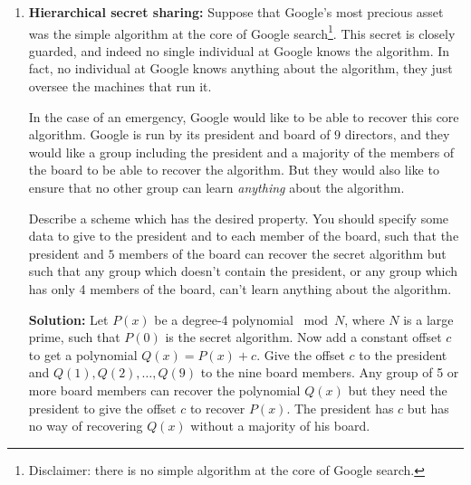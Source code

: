 \documentclass[11pt,fleqn]{article}
\begin{document}
\begin{enumerate}
\item \textbf{Hierarchical secret sharing:}
Suppose that Google's most precious asset
was the simple algorithm at the core of Google search\footnote{Disclaimer: 
there is no simple algorithm at the core of Google search.}.
This secret is closely guarded,
and indeed no single individual at Google knows the algorithm.
In fact, no individual at Google knows anything about the algorithm,
they just oversee the machines that run it.

In the case of an emergency, Google would like to be able to recover this core algorithm.
Google is run by its president and board of $9$ directors,
and they would like a group including
the president and a majority of the members of the board to be able to recover the algorithm.
But they would also like to ensure that no other group can learn \emph{anything} about the algorithm.

Describe a scheme which has the desired property.
You should specify some data to give to the president
and to each member of the board,
such that the president and $5$ members of the board can recover
the secret algorithm but such that any group which doesn't contain the president,
or any group which has only 4 members of the board,
can't learn anything about the algorithm.

\textbf{Solution:} Let $P(x)$ be a degree-4 polynomial $\bmod N$, where $N$ is a large prime, such that $P(0)$ is the secret algorithm.
Now add a constant offset $c$ to get a polynomial $Q(x) = P(x)+c$.
Give the offset $c$ to the president and $Q(1),Q(2),\ldots,Q(9)$ to the nine board members.
Any group of 5 or more board members can recover the polynomial $Q(x)$ but they need the president to give the offset $c$ to recover $P(x)$.
The president has $c$ but has no way of recovering $Q(x)$ without a majority of his board.


\end{enumerate}
\end{document}
